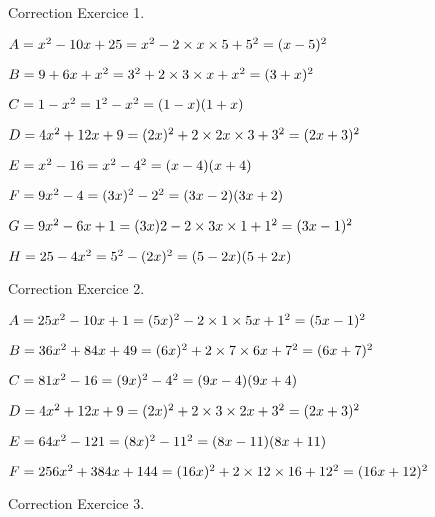 
Correction Exercice 1.

$ A=x^2-10x+25 \\
=x^2-2\times x \times 5+5^2 \\
=(x-5)^2
$

$B=9+6x+x^2 \\
=3^2+2\times 3 \times x+x^2 \\
=(3+x)^2
$

$C=1-x^2 \\
=1^2-x^2 \\
=(1-x)(1+x)
$

$D=4x^2+12x+9 \\
=(2x)^2+2\times 2x \times 3 +3^2 \\
=(2x+3)^2
$

$E=x^2-16 \\
=x^2-4^2\\
=(x-4)(x+4)
$

$F=9x^2-4 \\
=(3x)^2-2^2 \\
=(3x-2)(3x+2)
$

$G=9x^2-6x+1 \\
=(3x)2-2\times 3x \times 1+1^2 \\
=(3x-1)^2
$

$H=25-4x^2 \\
=5^2-(2x)^2 \\
=(5-2x)(5+2x)
$

Correction Exercice 2.

$A=25x^2-10x+1 \\
=(5x)^2-2\times 1\times 5x+1^2\\
=(5x-1)^2$

$B=36x^2+84x+49\\
=(6x)^2+2\times 7\times 6x+7^2\\
=(6x+7)^2$

$C=81x^2-16\\
=(9x)^2-4^2\\
=(9x-4)(9x+4)$

$D=4x^2+12x+9\\
=(2x)^2+2\times 3\times 2x+3^2\\
=(2x+3)^2$

$E=64x^2-121\\
=(8x)^2-11^2\\
=(8x-11)(8x+11)$

$F=256x^2+384x+144\\
=(16x)^2+2\times 12\times 16+12^2\\
=(16x+12)^2$

Correction Exercice 3.

